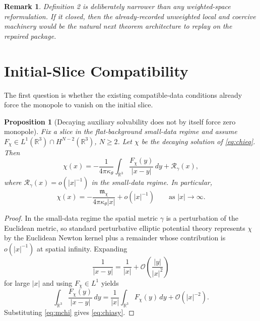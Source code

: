 \documentclass[11pt]{article}
\newtheorem{proposition}{Proposition}
\newtheorem{remark}{Remark}
\begin{document}
\begin{remark}
Definition 2 is deliberately narrower than any weighted-space reformulation. If it closed, then the already-recorded unweighted local and coercive machinery would be the natural next theorem architecture to replay on the repaired package.
\end{remark}

\section{Initial-Slice Compatibility}

The first question is whether the existing compatible-data conditions already force the monopole to vanish on the initial slice.

\begin{proposition}[Decaying auxiliary solvability does not by itself force zero monopole]
\label{prop:coulomb}
Fix a slice in the flat-background small-data regime and assume \(F_\chi\in L^1(\mathbb R^3)\cap H^{N-2}(\mathbb R^3)\), \(N\ge 2\). Let \(\chi\) be the decaying solution of \eqref{eq:chieq}. Then
\begin{equation}
\chi(x)
=
-\frac{1}{4\pi\kappa_\theta}
\int_{\mathbb R^3}\frac{F_\chi(y)}{|x-y|}\,dy
+ \mathcal R_\gamma(x),
\label{eq:greenrep}
\end{equation}
where \(\mathcal R_\gamma(x)=o(|x|^{-1})\) in the small-data regime. In particular,
\begin{equation}
\chi(x)
=
-\frac{\mathfrak m_\chi}{4\pi\kappa_\theta |x|}
+ o(|x|^{-1})
\qquad\text{as } |x|\to\infty.
\label{eq:chiasy}
\end{equation}
\end{proposition}

\begin{proof}
In the small-data regime the spatial metric \(\gamma\) is a perturbation of the Euclidean metric, so standard perturbative elliptic potential theory represents \(\chi\) by the Euclidean Newton kernel plus a remainder whose contribution is \(o(|x|^{-1})\) at spatial infinity. Expanding
\[
\frac{1}{|x-y|}
=
\frac{1}{|x|}
+ \mathcal O\!\left(\frac{|y|}{|x|^2}\right)
\]
for large \(|x|\) and using \(F_\chi\in L^1\) yields
\[
\int_{\mathbb R^3}\frac{F_\chi(y)}{|x-y|}\,dy
=
\frac{1}{|x|}\int_{\mathbb R^3}F_\chi(y)\,dy
+ \mathcal O(|x|^{-2}).
\]
Substituting \eqref{eq:mchi} gives \eqref{eq:chiasy}.
\end{proof}
\end{document}
